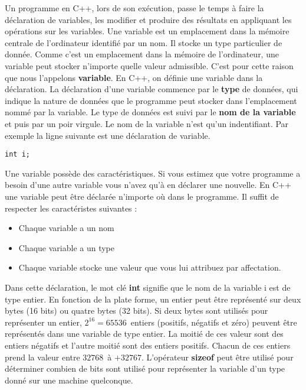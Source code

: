 \documentclass[a4paper, oneside,11pt]{book}
\begin{document}
Un programme en C++, lors de son ex\'ecution, passe le temps \`a faire la d\'eclaration de variables, les modifier et produire des r\'esultats en appliquant les op\'erations sur 
les variables.
Une variable est un emplacement dans la m\'emoire centrale de l'ordinateur identifi\'e par un nom. Il stocke un type particulier de donn\'ee. 
Comme c'est un emplacement dans la m\'emoire de l'ordinateur, une variable peut stocker n'importe quelle valeur admissible. C'est pour cette raison que nous 
l'appelons \textbf{variable}. En C++, on d\'efinie une variable dans la d\'eclaration. La d\'eclaration d'une variable commence par le \textbf{type} de donn\'ees, 
qui indique la nature de donn\'ees que  le programme peut stocker dans l'emplacement nomm\'e par la variable. Le type de donn\'ees est suivi par le 
\textbf{nom de la variable} et puis par un poir virgule. Le nom de la variable n'est qu'un indentifiant. Par exemple 
la ligne suivante est une d\'eclaration de variable. 







\begin{lstlisting}
int i;
\end{lstlisting}

Une variable poss\`ede des caract\'eristiques. Si vous estimez que votre programme a besoin d'une autre variable vous n'avez
qu'\`a en d\'eclarer une nouvelle. En C++ une variable peut \^etre d\'eclar\'ee n'importe o\`u dans le programme. Il suffit de  respecter les caract\'eristes suivantes : 

\begin{itemize}
\item Chaque variable a un nom
\item Chaque variable a un type
\item Chaque variable stocke une valeur que vous lui attribuez par affectation.
\end{itemize}

Dans cette d\'eclaration, le mot cl\'e \textbf{int} signifie que le nom de la variable i est de type entier. En fonction de la plate forme, un entier peut \^etre 
repr\'esent\'e sur deux 
bytes (16 bits) ou quatre bytes (32 bits). Si deux bytes sont utilis\'es pour repr\'esenter un entier, $2^{16} = 65536$\ entiers (positifs, n\'egatifs et z\'ero) 
peuvent \^etre repr\'esent\'es dans une variable de type entier. La moiti\'e de ces valeur sont des entiers n\'egatifs et l'autre moiti\'e sont des entiers positifs. Chacun de ces 
entiers prend la valeur entre $32768$\ \`a $+32767$. L'op\'erateur \textbf{sizeof} 
peut \^etre utilis\'e pour d\'eterminer combien de bits sont utilis\'e pour
repr\'esenter la variable d'un type donn\'e sur une machine quelconque.
\end{document}
